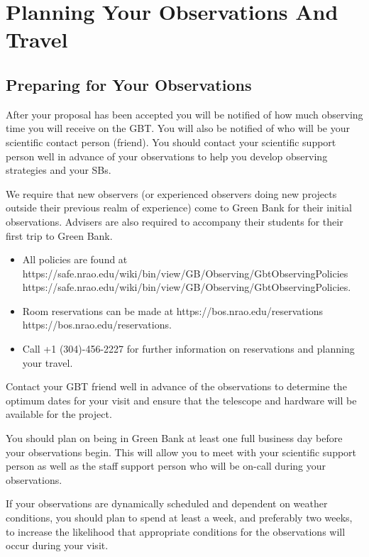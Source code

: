 \chapter{Planning Your Observations And Travel}\label{chap:travel}

\section{Preparing for Your Observations}

After your proposal has been accepted you will be notified of how much
observing time you will receive on the \gls{GBT}.  You will also be notified
of who will be your scientific contact person (friend).  You should contact your
scientific support person well in advance of your observations to help you develop
observing strategies and your \glspl{SB}.

We require that new observers (or experienced observers doing new projects outside
their previous realm of experience) come to Green Bank for their initial observations.
Advisers are also required to accompany their students for their first trip to
Green Bank.

\begin{itemize}[leftmargin=*]
\item All policies are found at
\htmladdnormallink
{https://safe.nrao.edu/wiki/bin/view/GB/Observing/GbtObservingPolicies}
{https://safe.nrao.edu/wiki/bin/view/GB/Observing/GbtObservingPolicies}.
\item Room reservations can be made at
\htmladdnormallink
{https://bos.nrao.edu/reservations}
{https://bos.nrao.edu/reservations}.
\item Call +1 (304)-456-2227 for further information on reservations
and planning your travel.
\end{itemize}

Contact your GBT friend well in advance of the observations to determine the
optimum dates for your visit and ensure that the telescope and hardware
will be available for the project.

You should plan on being in Green Bank at least one full business day before
your observations begin.  This will allow you to meet with your scientific
support person as well as the staff support person who will be on-call
during your observations.

If your observations are dynamically scheduled and dependent on weather
conditions, you should plan to spend at least a week, and preferably two
weeks, to increase the likelihood that appropriate conditions for the 
observations will occur during your visit.


